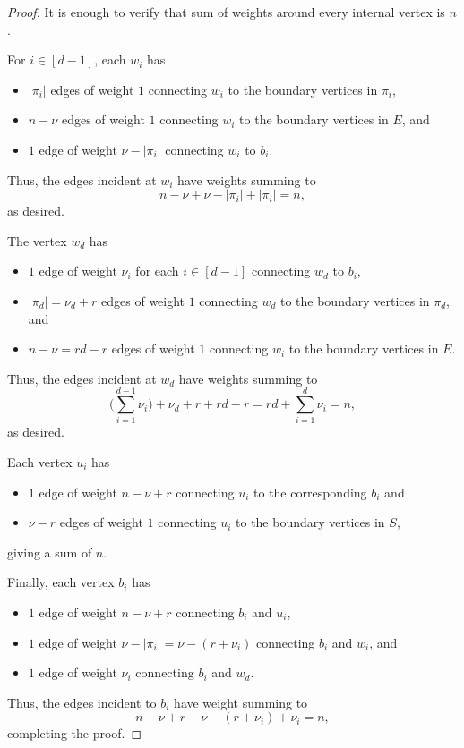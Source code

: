 \documentclass[10pt]{amsart}
\theoremstyle{definition}
\theoremstyle{plain}
\theoremstyle{plain}
\theoremstyle{definition}
\theoremstyle{remark}
\theoremstyle{plain}
\theoremstyle{plain}
\theoremstyle{plain}
\numberwithin{equation}{section}
\begin{document}
\begin{proof}
    It is enough to verify that sum of weights around every internal vertex is $n$.

   For $i\in [d-1]$, each $w_i$  has 
\begin{itemize}
    \item $|\pi_i|$ edges of weight $1$ connecting $w_i$ to the boundary vertices in $\pi_i$,
    \item $n-\nu$ edges of weight $1$ connecting $w_i$ to the boundary vertices in $E$, and
    \item $1$ edge of weight $\nu-|\pi_i|$ connecting $w_i$ to $b_i$.
\end{itemize} 
Thus, the edges incident at $w_i$ have weights summing to \[n - \nu + \nu - |\pi_i| + |\pi_i| =n,\] as desired.
 
 The vertex $w_d$ has 
 \begin{itemize}
     \item $1$ edge of weight $\nu_i$ for each $i\in[d-1]$ connecting $w_d$ to $b_i$,
     \item $|\pi_d|=\nu_d+r$ edges of weight $1$ connecting $w_d$ to the boundary vertices in $\pi_d$, and
     \item $n-\nu = rd-r$ edges of weight $1$ connecting $w_i$ to the boundary vertices in $E$.
 \end{itemize}
 Thus, the edges incident at $w_d$ have weights summing to \[\Bigg( \sum_{i=1}^{d-1}\nu_i \Bigg) +\nu_d +r +rd-r = 
 rd + \sum_{i=1}^{d}\nu_i =n,\]
 as desired.
 
 
Each vertex $u_i$ has 
\begin{itemize}
    \item $1$ edge of weight $n-\nu+r$ connecting $u_i$ to the corresponding $b_i$ and
    \item $\nu-r$ edges of weight $1$ connecting $u_i$ to the boundary vertices in $S$,
\end{itemize}
giving a sum of $n$.

Finally, each vertex $b_i$ has 
\begin{itemize}
    \item $1$ edge of weight $n-\nu+r$ connecting $b_i$ and $u_i$,
    \item $1$ edge of weight $\nu-|\pi_i|=\nu-(r+\nu_i)$ connecting $b_i$ and $w_i$, and 
    \item $1$ edge of weight $\nu_i$ connecting $b_i$ and $w_d$.
\end{itemize}
Thus, the edges incident to $b_i$ have weight summing to 
\[
n-\nu + r + \nu-(r+\nu_i) +\nu_i= n,
\]
completing the proof.
\end{proof}
\end{document}
